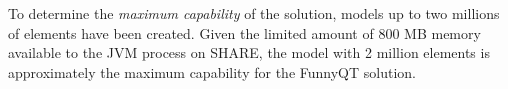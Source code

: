 \documentclass[submission]{eptcs}
\begin{document}
\begin{sloppypar}
  To determine the \emph{maximum capability} of the solution, models up to two
  millions of elements have been created.  Given the limited amount of 800 MB
  memory available to the JVM process on SHARE, the model with 2 million
  elements is approximately the maximum capability for the FunnyQT solution.
\end{sloppypar}

\FloatBarrier



\end{document}
